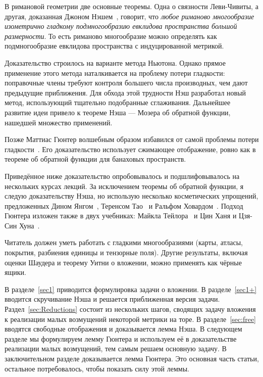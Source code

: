 \thispagestyle{empty}

\begin{abstract}
\noindent Излагается доказательство теоремы Нэша о гладком вложении. Упор сделан на простоту и строгость.
\end{abstract}

В римановой геометрии две основные теоремы.
Одна о связности Леви-Чивиты, а другая, доказанная Джоном Нэшем~\cite{nash-1956-ru},
говорит, что \textit{любое риманово многообразие изометрично гладкому подмногообразию евклидова пространства большой размерности}.
То есть риманово многообразие можно определять как подмногообразие евклидова пространства с индуцированной метрикой.

Доказательство строилось на варианте метода Ньютона.
Однако прямое применение этого метода наталкивается на проблему потери гладкости: поправочные члены требуют контроля большего числа производных, чем дают предыдущие приближения.
Для обхода этой трудности Нэш разработал новый метод, использующий тщательно подобранные сглаживания.
Дальнейшее развитие идеи привело к теореме Нэша --- Мозера об обратной функции, нашедшей множество применений.

Позже Маттиас Гюнтер волшебным образом избавился от самой проблемы потери гладкости~\cite{gunter}.
Его доказательство использует сжимающее отображение, ровно как в теореме об обратной функции для банаховых пространств.

Приведённое ниже доказательство опробовывалось и подшлифовывалось на нескольких курсах лекций.
За исключением теоремы об обратной функции, я следую доказательству Нэша, но использую несколько косметических упрощений, предложенных
Дином Янгом~\cite{yang},
Теренсом Тао~\cite{tao} и
Ральфом Ховардом~\cite{howard}.
Подход Гюнтера изложен также в двух учебниках:
Майкла Тейлора~\cite{taylor} и
Цин Ханя и Цзя-Син Хуна~\cite{han-hong}.

Читатель должен уметь работать с гладкими многообразиями (карты, атласы, покрытия, разбиения единицы и тензорные поля).
Другие результаты, включая оценки Шаудера и теорему Уитни о вложении, можно применять как чёрные ящики.

В разделе~\ref{sec1} приводится формулировка задачи о вложении.
В разделе~\ref{sec1+} вводится скручивание Нэша и решается приближенная версия задачи.
Раздел~\ref{sec:Reductions} состоит из нескольких шагов, сводящих задачу вложения к реализации малых возмущений некоторой метрики на торе.
В разделе~\ref{sec:free} вводятся свободные отображения и доказывается лемма Нэша.
В следующем разделе мы формулируем лемму Гюнтера и используем её в доказательстве реализации малых возмущений, тем самым решаем основную задачу.
В заключительном разделе доказывается лемма Гюнтера.
Это основная часть статьи, остальное потребовалось, чтобы показать силу этой леммы.

